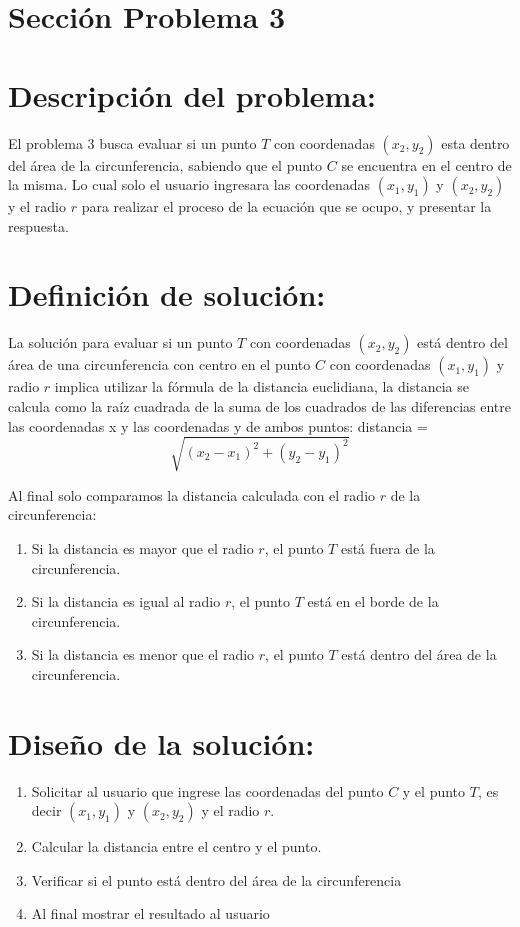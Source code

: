 \documentclass{IEEEcsmag}
\begin{document}
\section{Sección Problema 3}

\section*{Descripción del problema:}
\begin{enumerate}
El problema 3 busca evaluar si un punto $T$ con coordenadas $(x_{2}, y_{2})$ esta dentro del área de la circunferencia, sabiendo que el punto $C$ se encuentra en el centro de la misma. Lo cual solo el usuario ingresara las coordenadas $(x_{1}, y_{1})$ y $(x_{2}, y_{2})$  y el radio $r$ para realizar el proceso de la  ecuación que se ocupo, y presentar la respuesta.
\end{enumerate}


\section*{Definición de solución:}
La solución para evaluar si un punto $T$ con coordenadas $(x_{2}, y_{2})$ está dentro del área de una circunferencia con centro en el punto $C$ con coordenadas $(x_{1}, y_{1})$ y radio $r$ implica utilizar la fórmula de la distancia euclidiana, la distancia se calcula como la raíz cuadrada de la suma de los cuadrados de las diferencias entre las coordenadas x y las coordenadas y de ambos puntos:
distancia = 
\begin{equation}
   \sqrt{ (x_2 - x_1)^2 + (y_2 - y_1)^2 }     
\end{equation}



Al final solo comparamos la distancia calculada con el radio $r$ de la circunferencia:
\begin{enumerate}
\item Si la distancia es mayor que el radio $r$, el punto $T$ está fuera de la circunferencia.
\item Si la distancia es igual al radio $r$, el punto $T$ está en el borde de la circunferencia.
\item Si la distancia es menor que el radio $r$, el punto $T$ está dentro del área de la circunferencia.    
\end{enumerate}


\section*{Diseño de la solución:}
\begin{enumerate} 
\item Solicitar al usuario que ingrese las coordenadas del punto $C$ y el punto $T$, es decir $(x_{1}, y_{1})$ y $(x_{2}, y_{2})$ y el radio $r$.
\item Calcular la distancia entre el centro y el punto.
\item Verificar si el punto está dentro del área de la circunferencia
\item Al final mostrar el resultado al usuario 
\end{enumerate}
\end{document}
